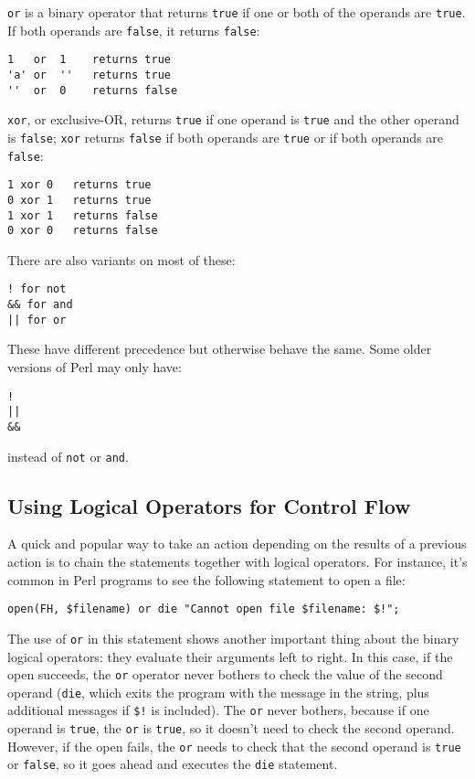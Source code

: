 \verb|or| is a binary operator that returns \verb|true| if one or both of the operands are \verb|true|. If both operands are \verb|false|, it returns \verb|false|:

\begin{lstlisting}
1   or  1    returns true
'a' or  ''   returns true
''  or  0    returns false
\end{lstlisting}

\verb|xor|, or exclusive-OR, returns \verb|true| if one operand is \verb|true| and the other operand is \verb|false|; \verb|xor| returns \verb|false| if both operands are \verb|true| or if both operands are \verb|false|:

\begin{lstlisting}
1 xor 0   returns true
0 xor 1   returns true
1 xor 1   returns false
0 xor 0   returns false
\end{lstlisting}

There are also variants on most of these:

\begin{lstlisting}
! for not
&& for and
|| for or
\end{lstlisting}

These have different precedence but otherwise behave the same. Some older versions of Perl may only have:

\begin{lstlisting}
!
||
&&
\end{lstlisting}

instead of \verb|not| or \verb|and|.

\subsection{Using Logical Operators for Control Flow}
A quick and popular way to take an action depending on the results of a previous action is to chain the statements together with logical operators. For instance, it's common in Perl programs to see the following statement to open a file:

\begin{lstlisting}
open(FH, $filename) or die "Cannot open file $filename: $!";
\end{lstlisting}

The use of \verb|or| in this statement shows another important thing about the binary logical operators: they evaluate their arguments left to right. In this case, if the open succeeds, the \verb|or| operator never bothers to check the value of the second operand (\verb|die|, which exits the program with the message in the string, plus additional messages if \verb|$!| is included). The \verb|or| never bothers, because if one operand is \verb|true|, the \verb|or| is \verb|true|, so it doesn't need to check the second operand. However, if the open fails, the \verb|or| needs to check that the second operand is \verb|true| or \verb|false|, so it goes ahead and executes the \verb|die| statement.

